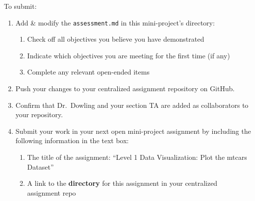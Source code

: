 \documentclass[
  man,
  floatsintext,
  longtable,
  nolmodern,
  notxfonts,
  notimes,
  colorlinks=true,linkcolor=blue,citecolor=blue,urlcolor=blue]{apa7}
\providecommand{\tightlist}{%
  \setlength{\itemsep}{0pt}\setlength{\parskip}{0pt}}
\begin{document}
To submit:

\begin{enumerate}
\def\labelenumi{\arabic{enumi}.}
\tightlist
\item
  Add \& modify the \texttt{assessment.md} in this mini-project's
  directory:

  \begin{enumerate}
  \def\labelenumii{\arabic{enumii}.}
  \tightlist
  \item
    Check off all objectives you believe you have demonstrated
  \item
    Indicate which objectives you are meeting for the first time (if
    any)
  \item
    Complete any relevant open-ended items
  \end{enumerate}
\item
  Push your changes to your centralized assignment repository on GitHub.
\item
  Confirm that Dr.~Dowling and your section TA are added as
  collaborators to your repository.
\item
  Submit your work in your next open mini-project assignment by
  including the following information in the text box:

  \begin{enumerate}
  \def\labelenumii{\arabic{enumii}.}
  \tightlist
  \item
    The title of the assignment: ``Level 1 Data Visualization: Plot the
    mtcars Dataset''
  \item
    A link to the \textbf{directory} for this assignment in your
    centralized assignment repo
  \end{enumerate}
\end{enumerate}
\end{document}
